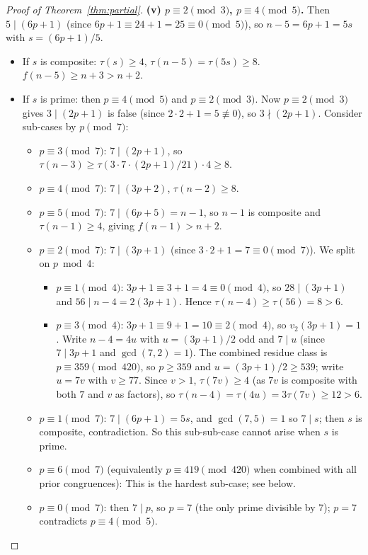 \documentclass[11pt]{article}
\begin{document}
\begin{proof}[Proof of Theorem~\ref{thm:partial}]
\textbf{(v) $p \equiv 2 \pmod{3}$, $p \equiv 4 \pmod{5}$.}
Then $5 \mid (6p+1)$ (since $6p+1 \equiv 24+1=25 \equiv 0 \pmod 5$), so
$n - 5 = 6p+1 = 5s$ with $s = (6p+1)/5$.
\begin{itemize}
\item If $s$ is composite: $\tau(s) \ge 4$, $\tau(n-5) = \tau(5s) \ge 8$.
      $f(n-5) \ge n+3 > n+2$.
\item If $s$ is prime: then $p \equiv 4 \pmod 5$ and $p \equiv 2 \pmod 3$.
  Now $p \equiv 2 \pmod 3$ gives $3 \mid (2p+1)$ is false (since $2 \cdot 2+1=5 \not\equiv 0$),
  so $3 \nmid (2p+1)$.  Consider sub-cases by $p \pmod{7}$:
  \begin{itemize}
  \item $p \equiv 3 \pmod 7$: $7 \mid (2p+1)$, so $\tau(n-3) \ge \tau(3 \cdot 7 \cdot (2p+1)/21) \cdot 4 \ge 8$.
  \item $p \equiv 4 \pmod 7$: $7 \mid (3p+2)$, $\tau(n-2) \ge 8$.
  \item $p \equiv 5 \pmod 7$: $7 \mid (6p+5) = n-1$, so $n-1$ is composite and
        $\tau(n-1) \ge 4$, giving $f(n-1) > n+2$.
  \item $p \equiv 2 \pmod 7$: $7 \mid (3p+1)$ (since $3\cdot 2+1=7\equiv 0\pmod 7$).
        We split on $p \bmod 4$:
        \begin{itemize}
          \item $p \equiv 1 \pmod 4$: $3p+1 \equiv 3+1=4\equiv 0\pmod 4$, so
                $28 \mid (3p+1)$ and $56 \mid n-4 = 2(3p+1)$.
                Hence $\tau(n-4) \ge \tau(56) = 8 > 6$.
          \item $p \equiv 3 \pmod 4$: $3p+1 \equiv 9+1=10\equiv 2\pmod 4$, so
                $v_2(3p+1)=1$.  Write $n-4 = 4u$ with $u=(3p+1)/2$ odd
                and $7\mid u$ (since $7\mid 3p+1$ and $\gcd(7,2)=1$).
                The combined residue class is $p\equiv 359\pmod{420}$, so
                $p \ge 359$ and $u = (3p+1)/2 \ge 539$; write $u = 7v$
                with $v \ge 77$.  Since $v > 1$, $\tau(7v) \ge 4$
                (as $7v$ is composite with both $7$ and $v$ as factors),
                so $\tau(n-4) = \tau(4u) = 3\tau(7v) \ge 12 > 6$.
        \end{itemize}
  \item $p \equiv 1 \pmod 7$: $7 \mid (6p+1) = 5s$, and $\gcd(7,5)=1$ so $7 \mid s$;
        then $s$ is composite, contradiction.  So this sub-sub-case cannot arise
        when $s$ is prime.
  \item $p \equiv 6 \pmod 7$ (equivalently $p \equiv 419 \pmod{420}$ when combined
        with all prior congruences): This is the hardest sub-case; see below.
  \item $p \equiv 0 \pmod 7$: then $7 \mid p$, so $p = 7$ (the only prime divisible by 7);
        $p = 7$ contradicts $p \equiv 4 \pmod 5$.
  \end{itemize}
\end{itemize}


\end{proof}
\end{document}
